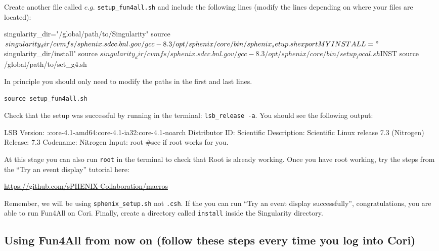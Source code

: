 \documentclass[12pt]{article}
\begin{document}
Create another file called $e.g.$ \verb|setup_fun4all.sh| and include the following lines (modify the lines depending on where your files are located):

\begin{tcolorbox}
\begin{verbnobox}[\scriptsize]
singularity_dir="/global/path/to/Singularity"
source ${singularity_dir}/cvmfs/sphenix.sdcc.bnl.gov/gcc-8.3/opt/sphenix/core/bin/sphenix_setup.sh
export MYINSTALL="${singularity_dir}/install" 
source ${singularity_dir}/cvmfs/sphenix.sdcc.bnl.gov/gcc-8.3/opt/sphenix/core/bin/setup_local.sh $INST
source /global/path/to/set_g4.sh
\end{verbnobox}  
\end{tcolorbox}

In principle you should only need to modify the paths in the first and last lines.

\verb|source setup_fun4all.sh|

Check that the setup was successful by running in the terminal: \verb|lsb_release -a|.
You should see the following output:

\begin{tcolorbox}
\begin{verbnobox}[\scriptsize]
LSB Version:	:core-4.1-amd64:core-4.1-ia32:core-4.1-noarch
Distributor ID:	Scientific
Description:	Scientific Linux release 7.3 (Nitrogen)
Release:	7.3
Codename:	Nitrogen
Input: root #see if root works for you.
\end{verbnobox}  
\end{tcolorbox}

At this stage you can also run \verb|root| in the terminal to check that Root is already working.
Once you have root working, try the steps from the ``Try an event display'' tutorial here:

\href{https://github.com/sPHENIX-Collaboration/macros}{https://github.com/sPHENIX-Collaboration/macros}

Remember, we will be using \verb|sphenix_setup.sh| not \verb|.csh|. If the you can run ``Try an event display successfully'', congratulations, you are able to run Fun4All on Cori.
Finally, create a directory called \verb|install| inside the Singularity directory.

\subsection{Using Fun4All from now on (follow these steps every time you log into Cori)}
\label{sec:every_login}
\end{document}
